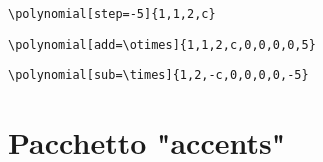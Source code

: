 \begin{center}
\begin{minipage}{.6\textwidth}
\begin{verbatim}
\end{verbatim}
\end{minipage}
\begin{minipage}{.35\textwidth}
\end{minipage}
\begin{minipage}{.7\textwidth}
\begin{verbatim}
\polynomial[step=-5]{1,1,2,c}
\end{verbatim}
\end{minipage}
\begin{minipage}{.2\textwidth}
\end{minipage}
\begin{minipage}{.7\textwidth}
\begin{verbatim}\polynomial[add=\otimes]{1,1,2,c,0,0,0,0,5}
\end{verbatim}
\end{minipage}
\begin{minipage}{.2\textwidth}
\end{minipage}
\begin{minipage}{.7\textwidth}
\begin{verbatim}\polynomial[sub=\times]{1,2,-c,0,0,0,0,-5}
\end{verbatim}
\end{minipage}
\begin{minipage}{.2\textwidth}
\end{minipage}
\end{center}
\section{Pacchetto "accents"}
